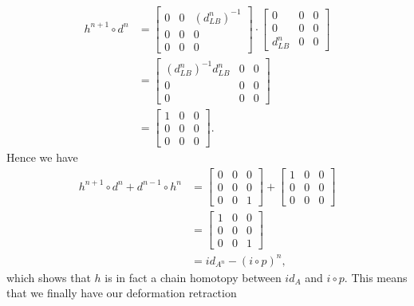 \begin{align*}
    h^{n+1}\circ d^n 
    &=
    \begin{bmatrix}
    0 & 0 & (d_{LB}^{n})^{-1}\\
    0 & 0 & 0\\
    0 & 0 & 0
    \end{bmatrix}
    \cdot 
    \begin{bmatrix}
    0 & 0 & 0 \\
    0 & 0 & 0 \\
    d^{n}_{LB} & 0 & 0
    \end{bmatrix} \\
    &=
    \begin{bmatrix}
    (d_{LB}^{n})^{-1}d^{n}_{LB} & 0 & 0\\
    0 & 0 & 0\\
    0 & 0 & 0
    \end{bmatrix} \\
    &=
    \begin{bmatrix}
    1 & 0 & 0\\
    0 & 0 & 0\\
    0 & 0 & 0
    \end{bmatrix} .
\end{align*}
Hence we have
\begin{align*}
    h^{n+1}\circ d^n + d^{n-1}\circ h^n 
    &= 
    \begin{bmatrix}
    0 & 0 & 0 \\
    0 & 0 & 0 \\
    0 & 0 & 1 
    \end{bmatrix}
    + 
    \begin{bmatrix}
    1 & 0 & 0 \\
    0 & 0 & 0 \\
    0 & 0 & 0 
    \end{bmatrix} \\
    &= 
    \begin{bmatrix}
    1 & 0 & 0 \\
    0 & 0 & 0 \\
    0 & 0 & 1
    \end{bmatrix} \\
    &= 
    id_{A^n} - (i\circ p)^n , 
\end{align*}
which shows that $h$ is in fact a chain homotopy between $id_A$ and $i\circ p$. This means that we finally have our deformation retraction
\begin{center}
\end{center}

